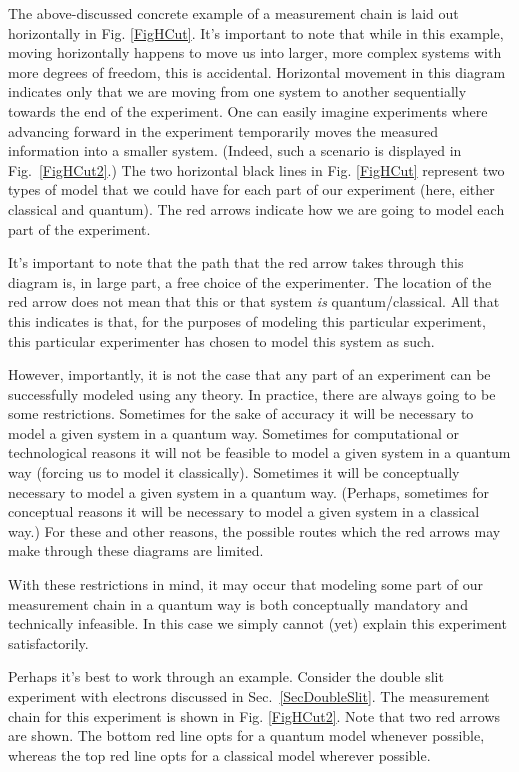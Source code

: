 \documentclass[prd,twocolumn,superscriptaddress,floatfix,amsmath,amssymb,amsfonts,nofootinbib]{revtex4-2}
\begin{document}
The above-discussed concrete example of a measurement chain is laid out horizontally in Fig. \ref{FigHCut}. It's important to note that while in this example, moving horizontally happens to move us into larger, more complex systems with more degrees of freedom, this is accidental. Horizontal movement in this diagram indicates only that we are moving from one system to another sequentially towards the end of the experiment. One can easily imagine experiments where advancing forward in the experiment temporarily moves the measured information into a smaller system. (Indeed, such a scenario is displayed in Fig.~\ref{FigHCut2}.) The two horizontal black lines in Fig. \ref{FigHCut} represent two types of model that we could have for each part of our experiment (here, either classical and quantum). The red arrows indicate how we are going to model each part of the experiment. 

It's important to note that the path that the red arrow takes through this diagram is, in large part, a free choice of the experimenter. The location of the red arrow does not mean that this or that system \textit{is} quantum/classical. All that this indicates is that, for the purposes of modeling this particular experiment, this particular experimenter has chosen to model this system as such.

However, importantly, it is not the case that any part of an experiment can be successfully modeled using any theory. In practice, there are always going to be some restrictions. Sometimes for the sake of accuracy it will be necessary to model a given system in a quantum way. Sometimes for computational or technological reasons it will not be feasible to model a given system in a quantum way (forcing us to model it classically). Sometimes it will be conceptually necessary to model a given system in a quantum way. (Perhaps, sometimes for conceptual reasons it will be necessary to model a given system in a classical way.) For these and other reasons, the possible routes which the red arrows may make through these diagrams are limited.

With these restrictions in mind, it may occur that modeling some part of our measurement chain in a quantum way is both conceptually mandatory and technically infeasible. In this case we simply cannot (yet) explain this experiment satisfactorily.

Perhaps it's best to work through an example. Consider the double slit experiment with electrons discussed in Sec.~\ref{SecDoubleSlit}. The measurement chain for this experiment is shown in Fig. \ref{FigHCut2}. Note that two red arrows are shown. The bottom red line opts for a quantum model whenever possible, whereas the top red line opts for a classical model wherever possible.
\end{document}
